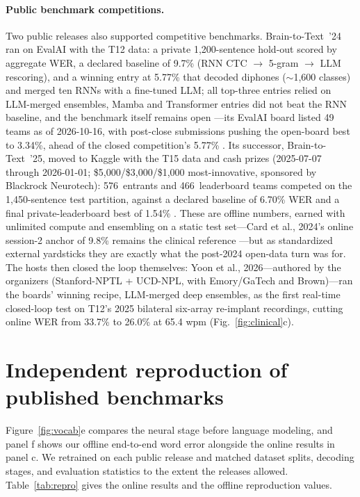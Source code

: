 \documentclass[11pt]{article}
\begin{document}
\paragraph{Public benchmark competitions.} Two public releases also
supported competitive benchmarks.
Brain-to-Text~'24 ran on EvalAI with the
T12 data: a private 1{,}200-sentence hold-out scored by aggregate WER, a
declared baseline of 9.7\% (RNN CTC $\to$ 5-gram $\to$ LLM rescoring),
and a winning entry at 5.77\% that decoded diphones ($\sim$1{,}600
classes) and merged ten RNNs with a fine-tuned LLM; all top-three
entries relied on LLM-merged ensembles, Mamba and Transformer entries
did not beat the RNN baseline, and the benchmark itself remains open
\cite{btot24lessons}---its EvalAI board listed 49 teams as of
2026-10-16, with post-close submissions pushing the open-board best to
3.34\%, ahead of the closed competition's 5.77\% \cite{evalai24board}.
Its successor, Brain-to-Text~'25, moved to Kaggle
with the T15 data and cash prizes (2025-07-07 through 2026-01-01;
\$5{,}000/\$3{,}000/\$1{,}000 most-innovative, sponsored by Blackrock
Neurotech): \mbox{576 entrants} and 466~leaderboard teams competed on the
1{,}450-sentence test partition, against a declared baseline of 6.70\%
WER and a final private-leaderboard best of 1.54\% \cite{btot25kaggle}.
These are offline numbers, earned with unlimited compute and ensembling
on a static test set---Card et al., 2024's online session-2 anchor of
9.8\% remains the clinical reference \cite{card2024}---but as
standardized external yardsticks they are exactly what the post-2024
open-data turn was for. The hosts then closed the loop themselves:
Yoon et al., 2026---authored by the organizers (Stanford-NPTL +
UCD-NPL, with Emory/GaTech and Brown)---ran the boards' winning
recipe, LLM-merged deep ensembles, as the first real-time closed-loop
test on T12's 2025 bilateral six-array re-implant recordings, cutting
online WER from 33.7\% to 26.0\% at 65.4 wpm
\cite{yoon2026} (Fig.~\ref{fig:clinical}c).

\section{Independent reproduction of published benchmarks}
\label{sec:repro}

Figure~\ref{fig:vocab}e compares the neural stage before language
modeling, and panel f shows our offline end-to-end word error alongside
the online results in panel c. We retrained on each public release
and matched dataset splits, decoding stages, and evaluation statistics
to the extent the releases allowed. Table~\ref{tab:repro} gives the
online results and the offline reproduction values.
\end{document}
